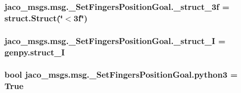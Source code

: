 \subsubsection[{\texorpdfstring{\+\_\+struct\+\_\+3f}{_struct_3f}}]{\setlength{\rightskip}{0pt plus 5cm}jaco\+\_\+msgs.\+msg.\+\_\+\+Set\+Fingers\+Position\+Goal.\+\_\+struct\+\_\+3f = struct.\+Struct(\char`\"{}$<$3f\char`\"{})\hspace{0.3cm}{\ttfamily [private]}}\hypertarget{namespacejaco__msgs_1_1msg_1_1__SetFingersPositionGoal_a3a3b16d5511096ef51a164ea187e26ca}{}\label{namespacejaco__msgs_1_1msg_1_1__SetFingersPositionGoal_a3a3b16d5511096ef51a164ea187e26ca}
\subsubsection[{\texorpdfstring{\+\_\+struct\+\_\+I}{_struct_I}}]{\setlength{\rightskip}{0pt plus 5cm}jaco\+\_\+msgs.\+msg.\+\_\+\+Set\+Fingers\+Position\+Goal.\+\_\+struct\+\_\+I = genpy.\+struct\+\_\+I\hspace{0.3cm}{\ttfamily [private]}}\hypertarget{namespacejaco__msgs_1_1msg_1_1__SetFingersPositionGoal_a840b83e8b2b747bfae2f2eb182ba547d}{}\label{namespacejaco__msgs_1_1msg_1_1__SetFingersPositionGoal_a840b83e8b2b747bfae2f2eb182ba547d}
\subsubsection[{\texorpdfstring{python3}{python3}}]{\setlength{\rightskip}{0pt plus 5cm}bool jaco\+\_\+msgs.\+msg.\+\_\+\+Set\+Fingers\+Position\+Goal.\+python3 = True}\hypertarget{namespacejaco__msgs_1_1msg_1_1__SetFingersPositionGoal_a546cf85ea3d1ce550dbad38016d71e66}{}\label{namespacejaco__msgs_1_1msg_1_1__SetFingersPositionGoal_a546cf85ea3d1ce550dbad38016d71e66}
